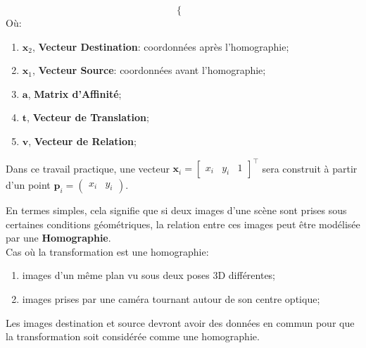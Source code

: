 \documentclass[../5RO17_TP1.tex]{subfiles}
\begin{document}
\begin{definition}
\begin{equation}
\begin{cases}
        \end{cases}
    \end{equation}
    Où:
    \begin{enumerate}[noitemsep]
        \item $\mathbf{x}_{2}$, \textbf{Vecteur Destination}: coordonnées après l'homographie;
        \item $\mathbf{x}_{1}$, \textbf{Vecteur Source}: coordonnées avant l'homographie;
        \item $\mathbf{a}$, \textbf{Matrix d'Affinité};
        \item $\mathbf{t}$, \textbf{Vecteur de Translation};
        \item $\mathbf{v}$, \textbf{Vecteur de Relation};
    \end{enumerate}
\end{definition}
\begin{remark}
    Dans ce travail practique, une vecteur $\mathbf{x}_{i} = \begin{bmatrix} x_{i} & y_{i} & 1 \end{bmatrix}^{\intercal}$ sera construit à partir d'un point $\mathbf{p}_{i} = \begin{pmatrix} x_{i} & y_{i} \end{pmatrix}$.
\end{remark}
\noindent En termes simples, cela signifie que si deux images d'une scène sont prises sous certaines conditions géométriques, la relation entre ces images peut être modélisée par une \textbf{Homographie}.\\

\noindent Cas où la transformation est une homographie:
\begin{enumerate}[noitemsep, rightmargin=\leftmargin]
    \item images d'un même plan vu sous deux poses 3D différentes;
    \item images prises par une caméra tournant autour de son centre optique;
\end{enumerate}
\begin{remark}
    Les images destination et source devront avoir des données en commun pour que la transformation soit considérée comme une homographie.
\end{remark}
\end{document}
